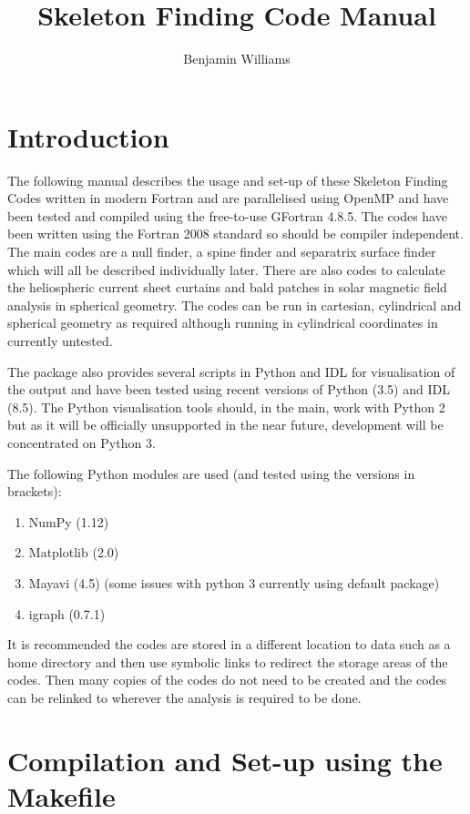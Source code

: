 \documentclass[12pt]{article}
\author{Benjamin Williams}
\title{Skeleton Finding Code Manual}
\begin{document}
  \maketitle

  \section{Introduction}

    The following manual describes the usage and set-up of these Skeleton Finding Codes written in modern Fortran and are parallelised using OpenMP and have been tested and compiled using the free-to-use GFortran 4.8.5. The codes have been written using the Fortran 2008 standard so should be compiler independent. The main codes are a null finder, a spine finder and separatrix surface finder which will all be described individually later. There are also codes to calculate the heliospheric current sheet curtains and bald patches in solar magnetic field analysis in spherical geometry. The codes can be run in cartesian, cylindrical and spherical geometry as required although running in cylindrical coordinates in currently untested.
    
    The package also provides several scripts in Python and IDL for visualisation of the output and have been tested using recent versions of Python (3.5) and IDL (8.5). The Python visualisation tools should, in the main, work with Python 2 but as it will be officially unsupported in the near future, development will be concentrated on Python 3.

    The following Python modules are used (and tested using the versions in brackets):
    \begin{enumerate}
      \item NumPy (1.12)
      \item Matplotlib (2.0)
      \item Mayavi (4.5) (some issues with python 3 currently using default package)
      \item igraph (0.7.1)
    \end{enumerate}
    
    It is recommended the codes are stored in a different location to data such as a home directory and then use symbolic links to redirect the storage areas of the codes. Then many copies of the codes do not need to be created and the codes can be relinked to wherever the analysis is required to be done. 

    \section{Compilation and Set-up using the Makefile}
\end{document}
